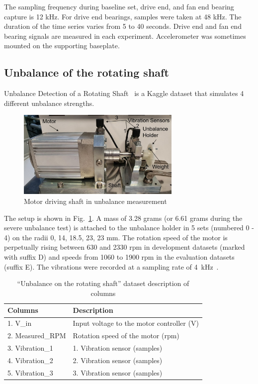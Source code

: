 The sampling frequency during baseline set, drive end, and fan end bearing capture is 12 kHz. For drive end bearings, samples were taken at 48 kHz. The duration of the time series varies from 5 to 40 seconds. Drive end and fan end bearing signals are measured in each experiment. Accelerometer was sometimes mounted on the supporting baseplate.

\subsection{Unbalance of the rotating shaft}
Unbalance Detection of a Rotating Shaft~\cite{unbalance_shaft} is a Kaggle dataset that simulates 4 different unbalance strengths. 
\begin{figure}[h]
\centering
\includegraphics[width=0.7\textwidth]{assets/analysis/rotating-shaft.jpg}
\caption{Motor driving shaft in unbalance measurement \cite{mey_machine_2020}}
\label{fig:rotating-shaft}
\end{figure}

The setup is shown in Fig.~\ref{fig:rotating-shaft}. A mass of 3.28 grams (or 6.61 grams during the severe unbalance test) is attached to the unbalance holder in 5 sets (numbered 0 - 4) on the radii 0, 14, 18.5, 23, 23 mm. The rotation speed of the motor is perpetually rising between 630 and 2330 rpm in development datasets (marked with suffix D) and speeds from 1060 to 1900 rpm in the evaluation datasets (suffix E). The vibrations were recorded at a sampling rate of 4~kHz~\cite{mey_machine_2020}.

\begin{table}[h]
\centering
\renewcommand{\arraystretch}{1.2}
\begin{tabular}{|l|l|}
\hline
\textbf{Columns} & \textbf{Description}                      \\ \hline
1. V\_in         & Input voltage to the motor controller (V) \\ \hline
2. Measured\_RPM & Rotation speed of the motor (rpm)  \\ \hline
3. Vibration\_1  & 1. Vibration sensor (samples)             \\ \hline
4. Vibration\_2  & 2. Vibration sensor (samples)             \\ \hline
5. Vibration\_3  & 3. Vibration sensor (samples)             \\ \hline
\end{tabular}
\caption{``Unbalance on the rotating shaft'' dataset description of columns}
\end{table}

